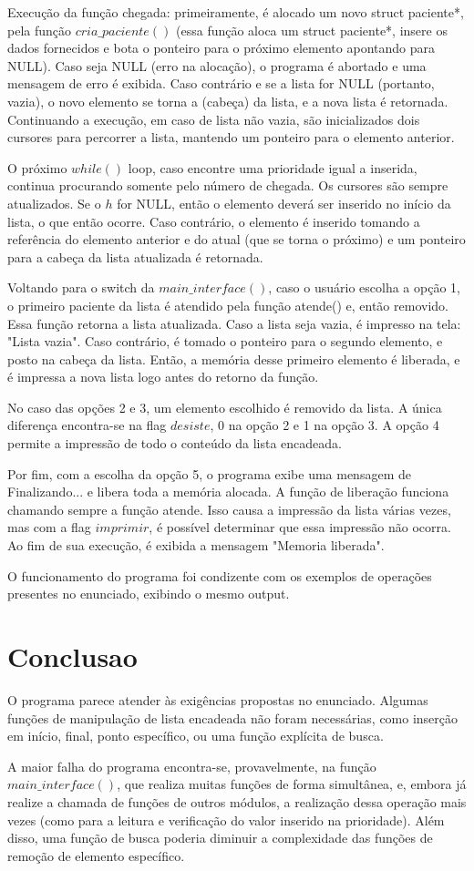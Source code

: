 \documentclass{article}
\begin{document}
Execução da função chegada: primeiramente, é alocado um novo struct paciente*, pela função $cria\_paciente()$ (essa função aloca um struct paciente*, insere os dados fornecidos e bota o ponteiro para o próximo elemento apontando para NULL). Caso seja NULL (erro na alocação), o programa é abortado e uma mensagem de erro é exibida. Caso contrário e se a lista for NULL (portanto, vazia), o novo elemento se torna a (cabeça) da lista, e a nova lista é retornada. Continuando a execução, em caso de lista não vazia, são inicializados dois cursores para percorrer a lista, mantendo um ponteiro para o elemento anterior.

O próximo $while()$ loop, caso encontre uma prioridade igual a inserida, continua procurando somente pelo número de chegada. Os cursores são sempre atualizados. Se o $h$ for NULL, então o elemento deverá ser inserido no início da lista, o que então ocorre. Caso contrário, o elemento é inserido tomando a referência do elemento anterior e do atual (que se torna o próximo) e um ponteiro para a cabeça da lista atualizada é retornada.

Voltando para o switch da $main\_interface()$, caso o usuário escolha a opção 1, o primeiro paciente da lista é atendido pela função atende() e, então removido. Essa função retorna a lista atualizada. Caso a lista seja vazia, é impresso na tela: "Lista vazia". Caso contrário, é tomado o ponteiro para o segundo elemento, e posto na cabeça da lista. Então, a memória desse primeiro elemento é liberada, e é impressa a nova lista logo antes do retorno da função.

No caso das opções 2 e 3, um elemento escolhido é removido da lista. A única diferença encontra-se na flag $desiste$, 0 na opção 2 e 1 na opção 3. A opção 4 permite a impressão de todo o conteúdo da lista encadeada.

Por fim, com a escolha da opção 5, o programa exibe uma mensagem de Finalizando... e libera toda a memória alocada. A função de liberação funciona chamando sempre a função atende. Isso causa a impressão da lista várias vezes, mas com a flag $imprimir$, é possível determinar que essa impressão não ocorra. Ao fim de sua execução, é exibida a mensagem "Memoria liberada".

O funcionamento do programa foi condizente com os exemplos de operações presentes no enunciado, exibindo o mesmo output.

\section{Conclusao}
O programa parece atender às exigências propostas no enunciado. Algumas funções de manipulação de lista encadeada não foram necessárias, como inserção em início, final, ponto específico, ou uma função explícita de busca.

A maior falha do programa encontra-se, provavelmente, na função $main\_interface()$, que realiza muitas funções de forma simultânea, e, embora já realize a chamada de funções de outros módulos, a realização dessa operação mais vezes (como para a leitura e verificação do valor inserido na prioridade). Além disso, uma função de busca poderia diminuir a complexidade das funções de remoção de elemento específico.
\end{document}
